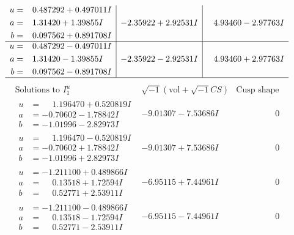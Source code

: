 \documentclass[1p]{elsarticle_modified}
\theoremstyle{definition}
\newcommand{\I}{\sqrt{-1}}
\begin{document}
$$\begin{array}{c|c|c}
\begin{aligned}
u &= \phantom{-}0.487292 + 0.497011 I \\
a &= \phantom{-}1.31420 + 1.39855 I \\
b &= \phantom{-}0.097562 + 0.891708 I\end{aligned}
 & -2.35922 + 2.92531 I & \phantom{-}4.93460 - 2.97763 I \\ \hline\begin{aligned}
u &= \phantom{-}0.487292 - 0.497011 I \\
a &= \phantom{-}1.31420 - 1.39855 I \\
b &= \phantom{-}0.097562 - 0.891708 I\end{aligned}
 & -2.35922 - 2.92531 I & \phantom{-}4.93460 + 2.97763 I\\
 \hline 
 \end{array}$$\newpage$$\begin{array}{c|c|c}  
\text{Solutions to }I^u_{1}& \I (\text{vol} + \sqrt{-1}CS) & \text{Cusp shape}\\
 \hline 
\begin{aligned}
u &= \phantom{-}1.196470 + 0.520819 I \\
a &= -0.70602 - 1.78842 I \\
b &= -1.01996 - 2.82973 I\end{aligned}
 & -9.01307 - 7.53686 I & \phantom{-0.000000 } 0 \\ \hline\begin{aligned}
u &= \phantom{-}1.196470 - 0.520819 I \\
a &= -0.70602 + 1.78842 I \\
b &= -1.01996 + 2.82973 I\end{aligned}
 & -9.01307 + 7.53686 I & \phantom{-0.000000 } 0 \\ \hline\begin{aligned}
u &= -1.211100 + 0.489866 I \\
a &= \phantom{-}0.13518 + 1.72594 I \\
b &= \phantom{-}0.52771 + 2.53911 I\end{aligned}
 & -6.95115 + 7.44961 I & \phantom{-0.000000 } 0 \\ \hline\begin{aligned}
u &= -1.211100 - 0.489866 I \\
a &= \phantom{-}0.13518 - 1.72594 I \\
b &= \phantom{-}0.52771 - 2.53911 I\end{aligned}
 & -6.95115 - 7.44961 I & \phantom{-0.000000 } 0 \\ \hline\begin{aligned}

\end{aligned}
\end{array}$$
\end{document}
